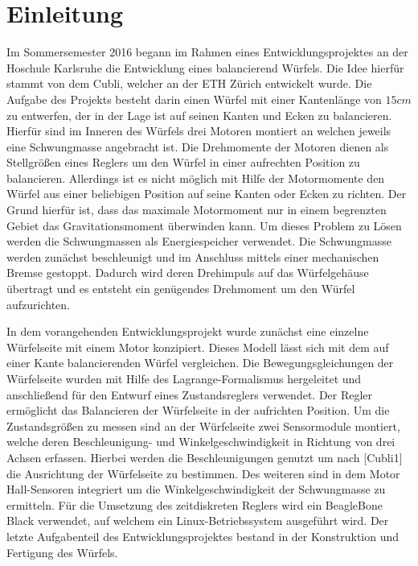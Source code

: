 \chapter{Einleitung}
Im Sommersemester 2016 begann im Rahmen eines Entwicklungsprojektes an der Hoschule Karlsruhe die Entwicklung eines balancierend Würfels. Die Idee hierfür stammt von dem Cubli, welcher an der ETH Zürich entwickelt wurde. Die Aufgabe des Projekts besteht darin einen Würfel mit einer Kantenlänge von $15cm$ zu entwerfen, der in der Lage ist auf seinen Kanten und Ecken zu balancieren. Hierfür sind im Inneren des Würfels drei Motoren montiert an welchen jeweils eine Schwungmasse angebracht ist. Die Drehmomente der Motoren dienen als Stellgrößen eines Reglers um den Würfel in einer aufrechten Position zu balancieren. Allerdings ist es nicht möglich mit Hilfe der Motormomente den Würfel aus einer beliebigen Position auf seine Kanten oder Ecken zu richten. Der Grund hierfür ist, dass das maximale Motormoment nur in einem begrenzten Gebiet das Gravitationsmoment überwinden kann. Um dieses Problem zu Lösen werden die Schwungmassen als Energiespeicher verwendet. Die Schwungmasse werden zunächst beschleunigt und im Anschluss mittels einer mechanischen Bremse gestoppt. Dadurch wird deren Drehimpuls auf das Würfelgehäuse übertragt und es entsteht ein genügendes Drehmoment um den Würfel aufzurichten.

In dem vorangehenden Entwicklungsprojekt wurde zunächst eine einzelne Würfelseite mit einem Motor konzipiert. Dieses Modell lässt sich mit dem auf einer Kante balancierenden Würfel vergleichen. Die Bewegungsgleichungen der Würfelseite wurden mit Hilfe des Lagrange-Formalismus hergeleitet und anschließend für den Entwurf eines Zustandsreglers verwendet. Der Regler ermöglicht das Balancieren der Würfelseite in der aufrichten Position. Um die Zustandsgrößen zu messen sind an der Würfelseite zwei Sensormodule montiert, welche deren Beschleunigung- und Winkelgeschwindigkeit in Richtung von drei Achsen erfassen. Hierbei werden die Beschleunigungen genutzt um nach [Cubli1] die Ausrichtung der Würfelseite zu bestimmen. Des weiteren sind in dem Motor Hall-Sensoren integriert um die Winkelgeschwindigkeit der Schwungmasse zu ermitteln. Für die Umsetzung des zeitdiskreten Reglers wird ein BeagleBone Black verwendet, auf welchem ein Linux-Betriebssystem ausgeführt wird. Der letzte Aufgabenteil des Entwicklungsprojektes bestand in der Konstruktion und Fertigung des Würfels.

